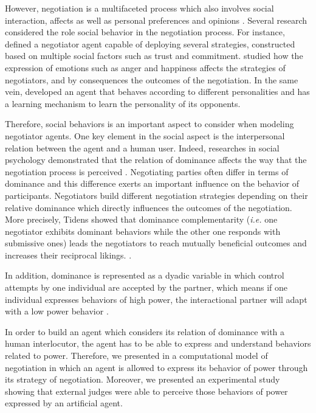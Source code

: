 \documentclass[sigconf]{aamas}  %
\begin{document}
	However, negotiation is a multifaceted process which also involves social interaction, affects as well as personal preferences and opinions  \cite{bro2010affective}. Several research considered the role social behavior in the negotiation process. For instance, \cite{traum2008multi} defined a negotiator agent capable of deploying several strategies, constructed based on multiple social factors such as trust and commitment. 
	\cite{de2011effect} studied how the expression of emotions such as anger and happiness affects the strategies of negotiators, and by consequences the outcomes of the negotiation. In the same vein, \cite{kraus1995designing} developed an agent that behaves according to different personalities and has a learning mechanism to learn the personality of its opponents.
	
	Therefore, social behaviors is an important aspect to consider when modeling negotiator agents. 	
	One key element in the social aspect is the interpersonal relation between the agent and a human user. 
	Indeed, researches in social psychology demonstrated that the relation of dominance affects the way that the negotiation process is perceived \cite{van2006power}. Negotiating parties often differ in terms of dominance and this difference exerts an important influence on the behavior of participants. Negotiators build different negotiation strategies depending on their relative dominance which directly influences the outcomes of the negotiation. 
	More precisely, Tidens \cite{tiedens2003power} showed that dominance complementarity (\emph{i.e.} one negotiator exhibits dominant behaviors while the other one responds with submissive ones) leads the negotiators to reach mutually beneficial outcomes and increases their reciprocal likings. \cite{wiltermuth2015benefits,tiedens2003power}.
	
	In addition, dominance is represented as a dyadic variable in which control attempts by one individual are accepted by the partner, which means if one individual expresses behaviors of high power, the interactional partner will adapt with a low power behavior \cite{burgoon1998nature}. 
	
	
	In order to build an agent which considers its relation of dominance with a human interlocutor, the agent has to be able to express and understand behaviors related to power. Therefore, we presented in \cite{ouali2017computational} a computational model of negotiation in which an agent is allowed to express its behavior of power through its strategy of negotiation. Moreover, we presented an experimental study showing that external judges were able to perceive those behaviors of power expressed by an artificial agent.
	
\end{document}
